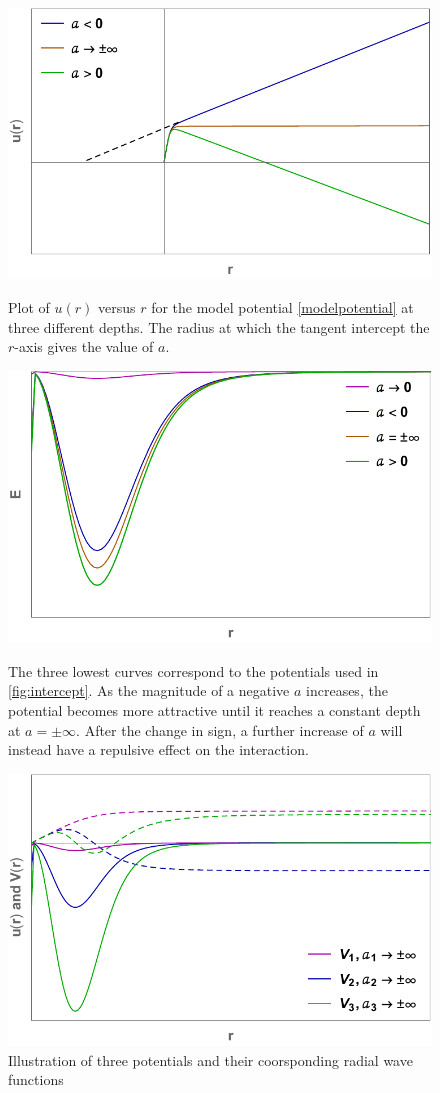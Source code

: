 \documentclass{article}
\numberwithin{equation}{section}
\numberwithin{figure}{section}
\begin{document}
\begin{figure}
	\centering
	\includegraphics[width=0.75\linewidth]{intercept}
	\caption{Plot of $u(r)$ versus $r$ for the model potential \eqref{modelpotential} at three different depths. The radius at which the tangent intercept the $r$-axis gives the value of $a$.}\label{fig:intercept}
	
	\vspace*{\floatsep}%
	
	\includegraphics[width=0.75\linewidth]{potential_depth}
	\caption{The three lowest curves correspond to the potentials used in \cref{fig:intercept}. As the magnitude of a negative $a$ increases, the potential becomes more attractive until it reaches a constant depth at $a=\pm\infty$. After the change in sign, a further increase of $a$ will instead have a repulsive effect on the interaction.}\label{fig:potential_depth} 
	
	\vspace*{\floatsep}%
	
	\includegraphics[width=0.75\linewidth]{scattapp}
	\caption{Illustration of three potentials and their coorsponding radial wave functions}\label{fig:scattapp}
\end{figure}
\end{document}
